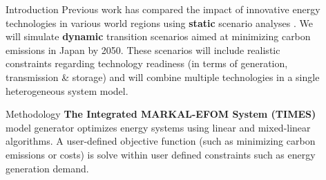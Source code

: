 \documentclass[final]{beamer}
\newlength{\sepwid}
\newlength{\onecolwid}
\newlength{\threecolwid}
\begin{document}
\begin{frame}[t]
\begin{columns}[t,totalwidth=\threecolwid]
\begin{column}{\onecolwid}

\begin{block}{Introduction}
Previous work has compared the impact of innovative energy technologies in 
various world regions using \textbf{static} scenario analyses 
\cite{chyong_chi_dynamics_2009,feng_system_2013,kikuchi_simulation-based_2017,li_energy_2010,pambudi_impact_2017,pambudi_future_2016}.  
We will simulate \textbf{dynamic} transition scenarios 
\cite{jebaraj_review_2006,pfenninger_energy_2014} aimed at minimizing carbon 
emissions in Japan by 2050. These scenarios will include realistic constraints 
regarding technology readiness (in terms of generation, transmission \& 
storage) and will combine multiple technologies in a single heterogeneous 
system model.
\end{block}

\begin{block}{Methodology}
        \textbf{The Integrated MARKAL-EFOM System (TIMES)} model generator 
        \cite{loulou_documentation_2005} 
        \cite{seebregts_energy/environmental_2002} optimizes energy systems 
        using linear and mixed-linear algorithms. A user-defined objective 
        function (such as minimizing carbon emissions or costs) is solve within user defined constraints such as energy generation demand.  
\end{block}



\end{column} %

\begin{column}{\sepwid}\end{column} %




\begin{column}{\onecolwid} %




\end{column}
\end{columns}
\end{frame}
\end{document}
